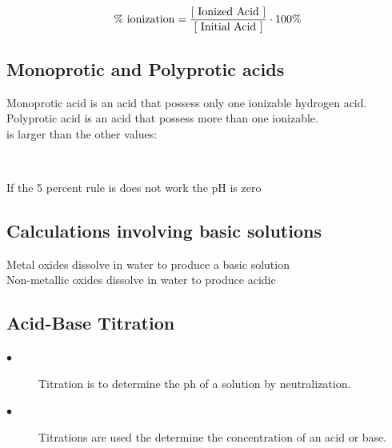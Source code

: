 \documentclass{article}
\begin{document}
\begin{paragraph}
\begin{equation*}  
  \text{\% ionization} = \frac{\text{[ Ionized Acid ]}}{\text{[ Initial Acid ]}}\cdot 100\%\\
\end{equation*}
 
\subsection{Monoprotic and Polyprotic acids}

Monoprotic acid is an acid that possess only one ionizable hydrogen acid.\\

\noindent
Polyprotic acid is an acid that possess more than one ionizable.\\

\noindent
{} is larger than the other  values:
\begin{center}
\\
\end{center}

\noindent
If the 5 percent rule is does not work the pH is zero\\

\subsection{Calculations involving basic solutions}

\begin{center}
\end{center}

\noindent
Metal oxides dissolve in water to produce a basic solution\\

\noindent
Non-metallic oxides dissolve in water to produce acidic 

\subsection{Acid-Base Titration}
\vspace{2mm}
 \begin{description}
 \item[$\bullet$]\noindent Titration is to determine the ph of a solution by neutralization.

\item[$\bullet$]\noindent Titrations are used the determine the concentration of an acid or base.


\end{description}
\end{paragraph}
\end{document}
